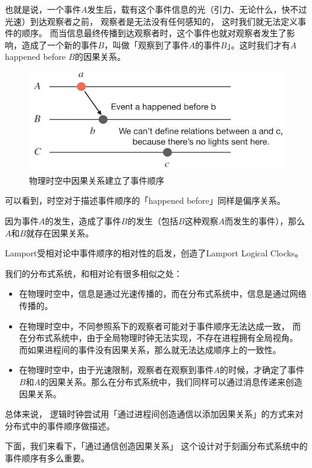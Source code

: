 \documentclass[cn,11pt,chinese]{elegantbook}
\providecommand{\tightlist}{%
  \setlength{\itemsep}{0pt}\setlength{\parskip}{0pt}}
\begin{document}
也就是说，一个事件\(A\)发生后，载有这个事件信息的光（引力、无论什么，快不过光速）到达观察者之前，
观察者是无法没有任何感知的， 这时我们就无法定义事件的顺序。
而当信息最终传播到达观察者时，这个事件也就对观察者发生了影响，造成了一个新的事件\(B\)，叫做「观察到了事件\(A\)的事件\(B\)」。这时我们才有\(A\)
happened before \(B\)的因果关系。

\begin{figure}
\centering
\includegraphics{images/appendix-a-07.jpeg}
\caption{物理时空中因果关系建立了事件顺序}
\end{figure}

可以看到，时空对于描述事件顺序的「happened before」同样是偏序关系。

因为事件\(A\)的发生，造成了事件\(B\)的发生（包括\(B\)这种观察\(A\)而发生的事件），那么\(A\)和\(B\)就存在因果关系。

Lamport受相对论中事件顺序的相对性的启发，创造了Lamport Logical Clocks。

我们的分布式系统，和相对论有很多相似之处：

\begin{itemize}
\tightlist
\item
  在物理时空中，信息是通过光速传播的，而在分布式系统中，信息是通过网络传播的。
\item
  在物理时空中，不同参照系下的观察者可能对于事件顺序无法达成一致，
  而在分布式系统中，由于全局物理时钟无法实现，不存在进程拥有全局视角。
  而如果进程间的事件没有因果关系，那么就无法达成顺序上的一致性。
\item
  在物理时空中，由于光速限制，观察者在观察到事件\(A\)的时候，才确定了事件\(B\)和\(A\)的因果关系。那么在分布式系统中，我们同样可以通过消息传递来创造因果关系。
\end{itemize}

总体来说，
逻辑时钟尝试用「通过进程间创造通信以添加因果关系」的方式来对分布式中的事件顺序做描述。

下面，我们来看下，「通过通信创造因果关系」
这个设计对于刻画分布式系统中的事件顺序有多么重要。
\end{document}
